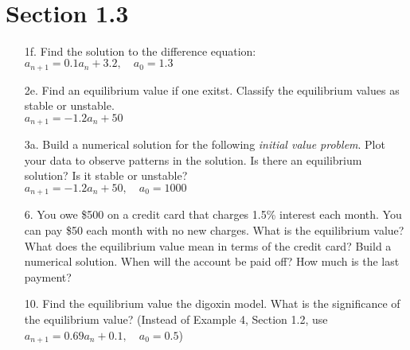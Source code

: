 \documentclass[10pt]{report}
\title{
	\courseTitle\\
	\hwNo\\
	\hwDate
}
\author{\hwAuther}
\date{}
\begin{document}
\maketitle



\section*{Section 1.3}
\begin{enumerate}
	\item [1f.]
	Find the solution to the difference equation:\\
	$a_{n+1} = 0.1 a_n + 3.2, \quad a_0 = 1.3$
	
	\item [2e.]
	Find an equilibrium value if one exitst. Classify the equilibrium values as stable or unstable.\\
	$a_{n+1} = -1.2 a_n + 50$
	
	\item [3a.]
	Build a numerical solution for the following \textit{initial value problem}. Plot your data to observe patterns in the solution. Is there an equilibrium solution? Is it stable or unstable?\\
	$a_{n+1} = -1.2 a_n + 50, \quad a_0 = 1000$
	
	\item [6.]
	You owe \$500 on a credit card that charges 1.5\% interest each month. You can pay \$50 each month with no new charges. What is the equilibrium value? What does the equilibrium value mean in terms of the credit card? Build a numerical solution. When will the account be paid off? How much is the last payment?
	
	\item [10.]
	Find the equilibrium value the digoxin model. What is the significance of the equilibrium value? (Instead of Example 4, Section 1.2, use $a_{n+1} = 0.69 a_n + 0.1, \quad a_0=0.5$)
\end{enumerate}
\end{document}
